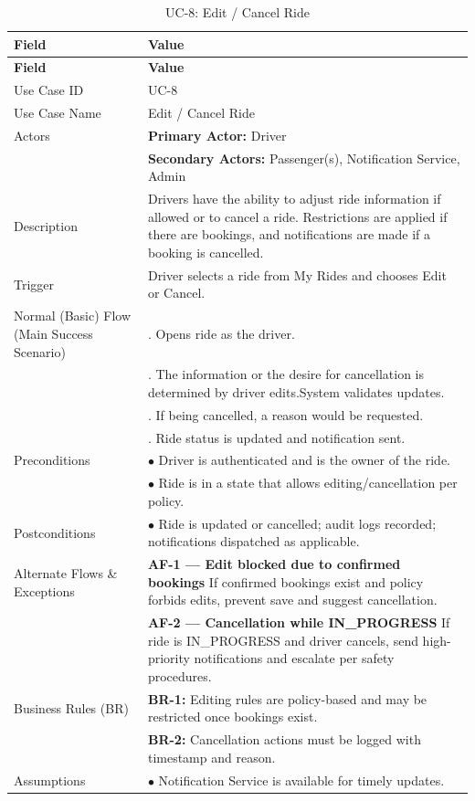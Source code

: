 \begin{longtable}{|>{\raggedright\arraybackslash}p{4cm}|>{\raggedright\arraybackslash}p{11cm}|}
\caption{UC-8: Edit / Cancel Ride}
\label{tab:uc-8} \\
\hline
\rowcolor{lightgray!30}
\textbf{Field} & \textbf{Value} \\
\hline
\endfirsthead
\hline
\rowcolor{lightgray!30}
\textbf{Field} & \textbf{Value} \\
\hline
\endhead
\hline
\endfoot
\hline
\endlastfoot
Use Case ID & UC-8 \\
\hline
Use Case Name & Edit / Cancel Ride \\
\hline
Actors & \textbf{Primary Actor:} Driver \\
& \textbf{Secondary Actors:} Passenger(s), Notification Service, Admin \\
\hline
Description & Drivers have the ability to adjust ride information if allowed or to cancel a ride. Restrictions are applied if there are bookings, and notifications are made if a booking is cancelled. \\
\hline
Trigger & Driver selects a ride from My Rides and chooses Edit or Cancel. \\
\hline
Normal (Basic) Flow (Main Success Scenario) & 1. Opens ride as the driver. \\
& 2. The information or the desire for cancellation is determined by driver edits.System validates updates. \\
& 3. If being cancelled, a reason would be requested. \\
& 4. Ride status is updated and notification sent. \\
\hline
Preconditions & $\bullet$ Driver is authenticated and is the owner of the ride. \\
& $\bullet$ Ride is in a state that allows editing/cancellation per policy. \\
\hline
Postconditions & $\bullet$ Ride is updated or cancelled; audit logs recorded; notifications dispatched as applicable. \\
\hline
Alternate Flows \& Exceptions & \textbf{AF-1 — Edit blocked due to confirmed bookings} \newline If confirmed bookings exist and policy forbids edits, prevent save and suggest cancellation. \\
& \textbf{AF-2 — Cancellation while IN\_PROGRESS} \newline If ride is IN\_PROGRESS and driver cancels, send high-priority notifications and escalate per safety procedures. \\
\hline
Business Rules (BR) & \textbf{BR-1:} Editing rules are policy-based and may be restricted once bookings exist. \\
& \textbf{BR-2:} Cancellation actions must be logged with timestamp and reason. \\
\hline
Assumptions & $\bullet$ Notification Service is available for timely updates. \\
\end{longtable}

